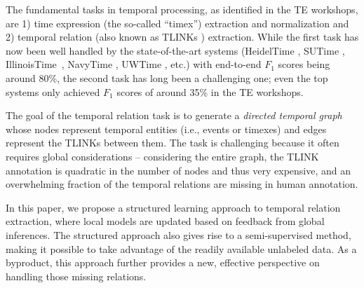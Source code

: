 \documentclass[11pt,letterpaper]{article}
\newcommand{\final}[1]{#1}
\begin{document}
The fundamental tasks in temporal processing, as identified in the TE workshops, are 1) time expression (the so-called ``timex'') extraction and normalization and 2) temporal relation (also known as TLINKs \citep{pustejovsky2003timeml}) extraction. 
While the first task has now been well handled by the state-of-the-art systems (HeidelTime \citep{strotgen2010heideltime}, SUTime \citep{chang2012sutime}, \final{IllinoisTime}~\citep{ZhaoDoRo12}, NavyTime \citep{chambers2013navytime}, UWTime \cite{lee2014context}, etc.) with end-to-end $F_1$ scores being around 80\%, the second task has long been a challenging one; even the top systems only achieved $F_1$ scores \final{of} around 35\% \final{in the TE workshops}.

The goal of the temporal relation task is to generate a \final{{\em directed temporal graph}} whose nodes represent temporal entities (i.e., events or timexes) and edges represent the TLINKs between them.
The task is challenging because \final{ it often requires global considerations -- considering the entire graph, the TLINK annotation is quadratic in the number of nodes and thus very expensive, and an overwhelming fraction of the temporal relations are missing in human annotation.}
\final{
In this paper, we propose a structured learning approach to temporal relation extraction, where local models are updated based on feedback from global inferences. The structured approach also gives rise to a semi-supervised method, making it possible to take advantage of the readily available unlabeled data. As a byproduct, this approach further provides a new, effective perspective on handling those missing relations.}
\end{document}
